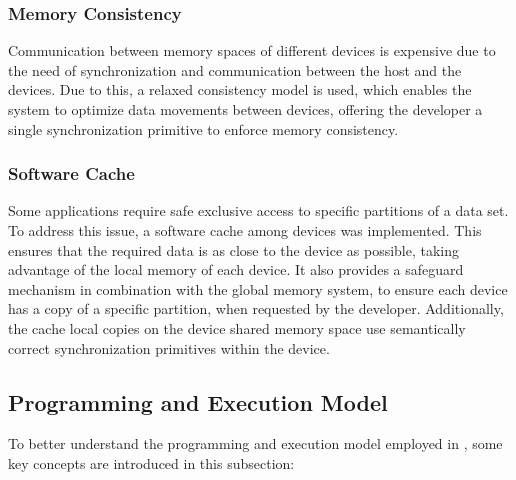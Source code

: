 \documentclass[main.tex]{subfiles}
\begin{document}
\subsubsection{Memory Consistency}

Communication between memory spaces of different devices is expensive due to the need of synchronization and communication between the host \cpu and the devices. Due to this, a relaxed consistency model is used, which enables the system to optimize data movements between devices, offering the developer a single synchronization primitive to enforce memory consistency.

\subsubsection{Software Cache}

Some applications require safe exclusive access to specific partitions of a data set. To address this issue, a software cache among devices was implemented. This ensures that the required data is as close to the device as possible, taking advantage of the local memory of each device. It also provides a safeguard mechanism in combination with the global memory system, to ensure each device has a copy of a specific partition, when requested by the developer. Additionally, the cache local copies on the device shared memory space use semantically correct synchronization primitives within the device.



\subsection{Programming and Execution Model}

To better understand the programming and execution model employed in \gama, some key concepts are introduced in this subsection:
\end{document}
